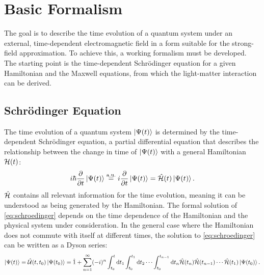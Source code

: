 \section{Basic Formalism}
The goal is to describe the time evolution of a quantum system under an external, time-dependent electromagnetic field in a form suitable for the strong-field approximation.
To achieve this, a working formalism must be developed.
The starting point is the time-dependent Schrödinger equation for a given Hamiltonian and the Maxwell equations, from which the light-matter interaction can be derived.





\subsection{Schrödinger Equation}
The time evolution of a quantum system $\ket{\Psi(t)}$ is determined by the time-dependent Schrödinger equation, a partial differential equation that describes the relationship between the change in time of $\ket{\Psi(t)}$ with a general Hamiltonian $\mathcal{H}(t)$:
\begin{equation}
    i \hbar \frac{\partial}{\partial t} \ket{\Psi(t)} \stackrel{\mathrm{a.u.}}{=} i\frac{\partial}{\partial t} \ket{\Psi(t)} = \hat{\mathcal{H}}(t) \ket{\Psi(t)}. \label{eq:schroedinger}
\end{equation}
$\hat{\mathcal{H}}$ contains all relevant information for the time evolution, meaning it can be understood as being generated by the Hamiltonian.
The formal solution of \eqref{eq:schroedinger} depends on the time dependence of the Hamiltonian and the physical system under consideration.
In the general case where the Hamiltonian does not commute with itself at different times, the solution to \eqref{eq:schroedinger} can be written as a Dyson series:
\begin{equation}
    \ket{\Psi(t)} = \hat{\mathcal{U}}(t,t_0)\ket{\Psi(t_0)} = \hat{1} + \sum_{n=1}^{\infty} (-i)^n \int_{t_0}^{t} \mathrm{d} t_1 \int_{t_0}^{t_1} \mathrm{d} t_2 \cdots \int_{t_0}^{t_{n-1}} \mathrm{d} t_n \hat{\mathcal{H}}(t_n) \hat{\mathcal{H}}(t_{n-1})\cdots\hat{\mathcal{H}}(t_1) \ket{\Psi(t_0)}. \label{eq:dyson}
\end{equation}





